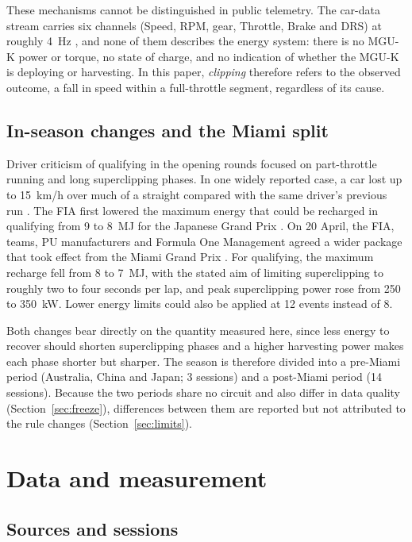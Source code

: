 \documentclass[11pt,a4paper]{article}
\begin{document}
These mechanisms cannot be distinguished in public telemetry. The car-data stream carries six channels (Speed, RPM, gear, Throttle, Brake and DRS) at roughly 4~Hz \citep{fastf1, openf1}, and none of them describes the energy system: there is no MGU-K power or torque, no state of charge, and no indication of whether the MGU-K is deploying or harvesting. In this paper, \emph{clipping} therefore refers to the observed outcome, a fall in speed within a full-throttle segment, regardless of its cause.

\subsection{In-season changes and the Miami split}

Driver criticism of qualifying in the opening rounds focused on part-throttle running and long superclipping phases. In one widely reported case, a car lost up to 15~km/h over much of a straight compared with the same driver's previous run \citep{noble2026leclerc}. The FIA first lowered the maximum energy that could be recharged in qualifying from 9 to 8~MJ for the Japanese Grand Prix \citep{f1technical2026suzuka}. On 20 April, the FIA, teams, PU manufacturers and Formula One Management agreed a wider package that took effect from the Miami Grand Prix \citep{fia2026refinements}. For qualifying, the maximum recharge fell from 8 to 7~MJ, with the stated aim of limiting superclipping to roughly two to four seconds per lap, and peak superclipping power rose from 250 to 350~kW. Lower energy limits could also be applied at 12 events instead of 8.

Both changes bear directly on the quantity measured here, since less energy to recover should shorten superclipping phases and a higher harvesting power makes each phase shorter but sharper. The season is therefore divided into a pre-Miami period (Australia, China and Japan; 3 sessions) and a post-Miami period (14 sessions). Because the two periods share no circuit and also differ in data quality (Section~\ref{sec:freeze}), differences between them are reported but not attributed to the rule changes (Section~\ref{sec:limits}).

\section{Data and measurement}
\label{sec:data}

\subsection{Sources and sessions}
\end{document}
